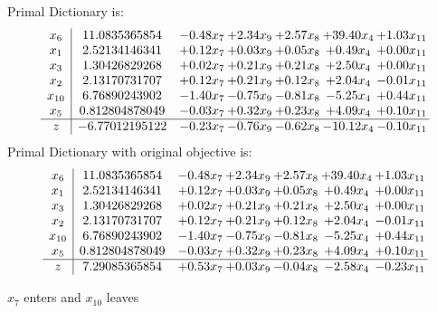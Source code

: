\documentclass[8pt]{article}
\begin{document}
Primal Dictionary is:
\[\begin{array}{c| c c@{\hskip 2pt} c@{\hskip 2pt} c@{\hskip 2pt} c@{\hskip 2pt} c@{\hskip 2pt} }
 x_{6}   &  11.0835365854 & -0.48 x_{7} & +  2.34 x_{9} & +  2.57 x_{8} & + 39.40 x_{4} & +  1.03 x_{11}\\
 x_{1}   &  2.52134146341 & +  0.12 x_{7} & +  0.03 x_{9} & +  0.05 x_{8} & +  0.49 x_{4} & +  0.00 x_{11}\\
 x_{3}   &  1.30426829268 & +  0.02 x_{7} & +  0.21 x_{9} & +  0.21 x_{8} & +  2.50 x_{4} & +  0.00 x_{11}\\
 x_{2}   &  2.13170731707 & +  0.12 x_{7} & +  0.21 x_{9} & +  0.12 x_{8} & +  2.04 x_{4} & -0.01 x_{11}\\
 x_{10}   &  6.76890243902 & -1.40 x_{7} & -0.75 x_{9} & -0.81 x_{8} & -5.25 x_{4} & +  0.44 x_{11}\\
 x_{5}   &  0.812804878049 & -0.03 x_{7} & +  0.32 x_{9} & +  0.23 x_{8} & +  4.09 x_{4} & +  0.10 x_{11}\\
\hline
z    &  -6.77012195122 & -0.23 x_{7} & -0.76 x_{9} & -0.62 x_{8} & -10.12 x_{4} & -0.10 x_{11}\\
\end{array}\]
Primal Dictionary with original objective is:
\[\begin{array}{c| c c@{\hskip 2pt} c@{\hskip 2pt} c@{\hskip 2pt} c@{\hskip 2pt} c@{\hskip 2pt} }
 x_{6}   &  11.0835365854 & -0.48 x_{7} & +  2.34 x_{9} & +  2.57 x_{8} & + 39.40 x_{4} & +  1.03 x_{11}\\
 x_{1}   &  2.52134146341 & +  0.12 x_{7} & +  0.03 x_{9} & +  0.05 x_{8} & +  0.49 x_{4} & +  0.00 x_{11}\\
 x_{3}   &  1.30426829268 & +  0.02 x_{7} & +  0.21 x_{9} & +  0.21 x_{8} & +  2.50 x_{4} & +  0.00 x_{11}\\
 x_{2}   &  2.13170731707 & +  0.12 x_{7} & +  0.21 x_{9} & +  0.12 x_{8} & +  2.04 x_{4} & -0.01 x_{11}\\
 x_{10}   &  6.76890243902 & -1.40 x_{7} & -0.75 x_{9} & -0.81 x_{8} & -5.25 x_{4} & +  0.44 x_{11}\\
 x_{5}   &  0.812804878049 & -0.03 x_{7} & +  0.32 x_{9} & +  0.23 x_{8} & +  4.09 x_{4} & +  0.10 x_{11}\\
\hline
z    &  7.29085365854 & +  0.53 x_{7} & +  0.03 x_{9} & -0.04 x_{8} & -2.58 x_{4} & -0.23 x_{11}\\
\end{array}\]


 $ x_{7} $ enters and $ x_{10} $ leaves 
\end{document}
